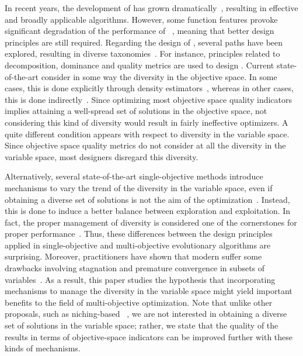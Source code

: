 %
In recent years, the development of \MOEAS{} has grown dramatically~\cite{van1998multiobjective, coello2007mop}, resulting 
in effective and broadly applicable algorithms.
%
However, some function features provoke significant degradation of the performance of \MOEAS{}~\cite{huband2006review}, 
meaning that better design principles are still required.
%
Regarding the design of \MOEAS{}, several paths have been explored, resulting in diverse taxonomies~\cite{trivedi2016survey}.
%
For instance, principles related to decomposition, dominance and quality metrics are used
to design \MOEAS{}.
%
Current state-of-the-art \MOEAS{} consider in some way the diversity in the objective space.
%
In some cases, this is done explicitly through density estimators~\cite{beume:07}, %
whereas in other cases,
this is done indirectly~\cite{zhang2007moea}. 
%
Since optimizing most objective space quality indicators implies attaining a well-spread set of solutions in the
objective space, not considering this kind of diversity would result in fairly ineffective optimizers.
%
A quite different condition appears with respect to diversity in the variable space.
%
Since objective space quality metrics do not consider at all the diversity in the variable space,
most \MOEA{} designers disregard this diversity.

Alternatively, %
several state-of-the-art single-objective methods introduce mechanisms to vary the trend of the 
diversity in the variable space, even if obtaining a diverse
set of solutions is not the aim of the optimization~\cite{Joel:Crepinsek}.
%
Instead, this is done to induce a better balance between exploration and exploitation.
%
In fact, the proper management of diversity is considered one of the cornerstones for proper performance~\cite{Herrera-Poyatos:17}.
%
Thus, these differences between the design principles applied in single-objective and multi-objective evolutionary 
algorithms are surprising.
%
Moreover, practitioners have shown that modern \MOEAS{} suffer some drawbacks involving stagnation and premature 
convergence in subsets of variables~\cite{ishibuchi2006comparison, castillo2017multi, buche2003self, lu2002dynamic}.
%
As a result, this paper studies the hypothesis that incorporating mechanisms to manage the diversity in the variable space 
might yield important benefits to the field of multi-objective optimization.
%
Note that unlike other proposals, such as niching-based \MOEAS{}~\cite{mahfoud1995niching, srinivas1994muiltiobjective}, we are not interested in obtaining
a diverse set of solutions in the variable space; rather, we state that the quality of the results in terms of objective-space indicators can be improved further with these
kinds of mechanisms.

